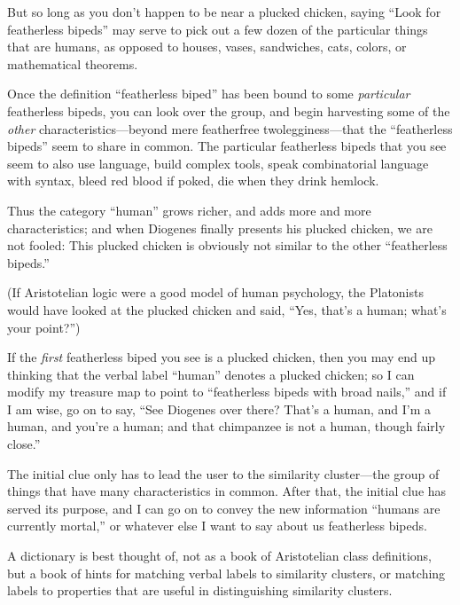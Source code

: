 {
 But so long as you don't happen to be near a
plucked chicken, saying ``Look for featherless
bipeds'' may serve to pick out a few dozen of the
particular things that are humans, as opposed to houses, vases,
sandwiches, cats, colors, or mathematical theorems.}

{
 Once the definition ``featherless
biped'' has been bound to some \textit{particular}
featherless bipeds, you can look over the group, and begin harvesting
some of the \textit{other} characteristics---beyond mere featherfree
twolegginess---that the ``featherless
bipeds'' seem to share in common. The particular
featherless bipeds that you see seem to also use language, build
complex tools, speak combinatorial language with syntax, bleed red
blood if poked, die when they drink hemlock.}

{
 Thus the category ``human''
grows richer, and adds more and more characteristics; and when Diogenes
finally presents his plucked chicken, we are not fooled: This plucked
chicken is obviously not similar to the other
``featherless bipeds.''}

{
 (If Aristotelian logic were a good model of human psychology, the
Platonists would have looked at the plucked chicken and said,
``Yes, that's a human;
what's your point?'')}

{
 If the \textit{first} featherless biped you see is a plucked
chicken, then you may end up thinking that the verbal label
``human'' denotes a plucked chicken;
so I can modify my treasure map to point to
``featherless bipeds with broad
nails,'' and if I am wise, go on to say,
``See Diogenes over there? That's a
human, and I'm a human, and you're a
human; and that chimpanzee is not a human, though fairly
close.''}

{
 The initial clue only has to lead the user to the similarity
cluster---the group of things that have many characteristics in common.
After that, the initial clue has served its purpose, and I can go on to
convey the new information ``humans are currently
mortal,'' or whatever else I want to say about us
featherless bipeds.}

{
 A dictionary is best thought of, not as a book of Aristotelian
class definitions, but a book of hints for matching verbal labels to
similarity clusters, or matching labels to properties that are useful
in distinguishing similarity clusters.}

\myendsectiontext


